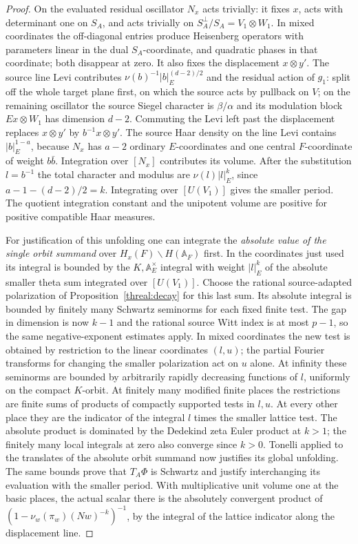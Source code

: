 \begin{proof}
On the evaluated residual oscillator \(N_x\) acts trivially:
it fixes \(x\), acts with determinant one on \(S_A\), and acts
trivially on \(S_A^\perp/S_A=V_1\otimes W_1\). In mixed coordinates
the off-diagonal entries produce Heisenberg operators with parameters
linear in the dual \(S_A\)-coordinate, and quadratic phases in that
coordinate; both disappear at zero. It also fixes the displacement
\(x\otimes y'\). The source line Levi contributes
\(\nu(b)^{-1}|b|_E^{(d-2)/2}\) and the residual action of \(g_1\):
split off the whole target plane first, on which the source acts
by pullback on \(V\); on the remaining oscillator the source
Siegel character is \(\beta/\alpha\) and its modulation block
\(Ex\otimes W_1\) has dimension \(d-2\). Commuting the Levi left
past the displacement replaces \(x\otimes y'\) by
\(b^{-1}x\otimes y'\). The source Haar density on the line Levi
contains \(|b|_E^{1-a}\), because \(N_x\) has \(a-2\) ordinary
\(E\)-coordinates and one central \(F\)-coordinate of weight
\(b\bar b\). Integration over \([N_x]\) contributes its volume.
After the substitution \(l=b^{-1}\) the total character and modulus
are \(\nu(l)|l|_E^k\), since \(a-1-(d-2)/2=k\).
Integrating over \([U(V_1)]\) gives the smaller period.
The quotient integration constant and the unipotent volume are
positive for positive compatible Haar measures.

For justification of this unfolding one can integrate the
\emph{absolute value of the single orbit summand} over
\(H_x(F)\backslash H(\mathbb A_F)\) first. In the coordinates just
used its integral is bounded by the \(K,\mathbb A_E^\times\)
integral with weight \(|l|_E^k\) of the absolute smaller theta
sum integrated over \([U(V_1)]\). Choose the rational
source-adapted polarization of Proposition~\ref{threal:decay} for
this last sum. Its absolute integral is bounded by finitely many
Schwartz seminorms for each fixed finite test. The gap in dimension
is now \(k-1\) and the rational source Witt index is at most \(p-1\),
so the same negative-exponent estimates apply. In mixed coordinates
the new test is obtained by restriction to the linear coordinates
\((l,u)\); the partial Fourier transforms for changing the smaller
polarization act on \(u\) alone. At infinity these seminorms are
bounded by arbitrarily rapidly decreasing functions of \(l\),
uniformly on the compact \(K\)-orbit. At finitely many modified
finite places the restrictions are finite sums of products of
compactly supported tests in \(l,u\). At every other place they
are the indicator of the integral \(l\) times the smaller lattice
test. The absolute product is dominated by the Dedekind zeta
Euler product at \(k>1\); the finitely many local integrals at zero
also converge since \(k>0\). Tonelli applied to the translates of
the absolute orbit summand now justifies its global unfolding.
The same bounds prove that \(T_A\Phi\) is Schwartz and justify
interchanging its evaluation with the smaller period.
With multiplicative unit volume one at the basic places, the actual
scalar there is the absolutely convergent product of
\((1-\nu_w(\pi_w)(Nw)^{-k})^{-1}\), by the integral of the
lattice indicator along the displacement line.


\end{proof}
